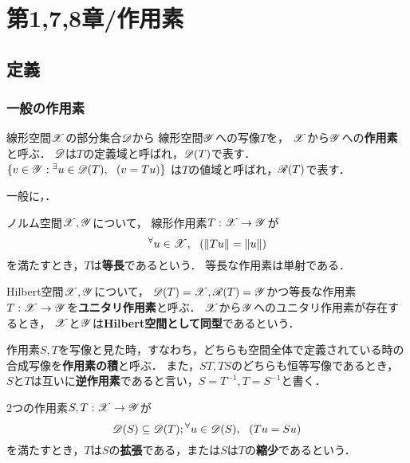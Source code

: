     \section{第1,7,8章/作用素}
    \subsection{定義}
    \subsubsection{一般の作用素}
    \begin{Def}
        線形空間$\mathscr{X}$の部分集合$\mathscr{D}$から
        線形空間$\mathscr{Y}$への写像$T$を，
        $\mathscr{X}$から$\mathscr{Y}$への\textbf{作用素}と呼ぶ．
        $\mathscr{D}$は$T$の定義域と呼ばれ，$\mathscr{D}(T)$で表す．
        $\{v \in \mathscr{Y} : {}^{\exists} u \in \mathscr{D}(T),~~ (v=Tu)\}$
        は$T$の値域と呼ばれ，$\mathscr{R}(T)$で表す．
    \end{Def}
    一般に，．

    \begin{Def}
        ノルム空間$\mathscr{X}, \mathscr{Y}$について，
        線形作用素$T:\mathscr{X} \to \mathscr{Y}$が
        \[ {}^{\forall}  u \in \mathscr{X},~~ (\| Tu \|=\|u\|) \]
        を満たすとき，$T$は\textbf{等長}であるという．
        等長な作用素は単射である．
    \end{Def}

    \begin{Def}
        Hilbert空間$\mathscr{X}, \mathscr{Y}$について，
        $\mathscr{D}(T)=\mathscr{X}, \mathscr{R}(T)=\mathscr{Y}$かつ等長な作用素$T:\mathscr{X} \to \mathscr{Y}$を\textbf{ユニタリ作用素}と呼ぶ．
        $\mathscr{X}$から$\mathscr{Y}$へのユニタリ作用素が存在するとき，
        $\mathscr{X}$と$\mathscr{Y}$は\textbf{Hilbert空間として同型}であるという．
    \end{Def}

    \begin{Def}
        作用素$S,T$を写像と見た時，すなわち，どちらも空間全体で定義されている時の合成写像を\textbf{作用素の積}と呼ぶ．
        また，$ST, TS$のどちらも恒等写像であるとき，
        $S$と$T$は互いに\textbf{逆作用素}であると言い，$S=T^{-1}, T=S^{-1}$と書く．
    \end{Def}

    \begin{Def}
        2つの作用素$S,T:\mathscr{X} \to \mathscr{Y}$が
        \[ \mathscr{D}(S) \subseteq \mathscr{D}(T); {}^{\forall}  u \in \mathscr{D}(S),~~ (Tu=Su) \]
        を満たすとき，$T$は$S$の\textbf{拡張}である，または$S$は$T$の\textbf{縮少}であるという．
    \end{Def}

